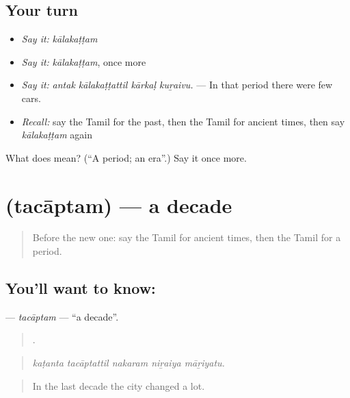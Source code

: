 \subsection*{Your turn}
\begin{itemize}
\raggedright
  \item \emph{Say it:} \emph{kālakaṭṭam}
  \item \emph{Say it:} \emph{kālakaṭṭam}, once more
  \item \emph{Say it:} \emph{antak kālakaṭṭattil kārkaḷ kuṟaivu.} — In that period there were few cars.
  \item \emph{Recall:} say the Tamil for the past, then the Tamil for ancient times, then say \emph{kālakaṭṭam} again
\end{itemize}

\begin{tcolorbox}[breakable,colback=teal!4,colframe=teal!35!black,title={Before you move on}]
What does  mean? (\textquotedblleft{}A period; an era\textquotedblright{}.) Say it once more.
\end{tcolorbox}
\section[\texorpdfstring{\ta{தசாப்தம்} (tacāptam)}{தசாப்தம் (tacāptam)}]{ (tacāptam) — a decade}

\label{lesson:TA-C326-tacaptam}



\begin{quote}
Before the new one: say the Tamil for ancient times, then the Tamil for a period.
\end{quote}

\subsection*{You'll want to know: }
\textbf{} — \emph{tacāptam} — \textquotedblleft{}a decade\textquotedblright{}.

\begin{quote}
    .
\end{quote}

\begin{quote}
\emph{kaṭanta tacāptattil nakaram niṟaiya māṟiyatu.}
\end{quote}

\begin{quote}
In the last decade the city changed a lot.
\end{quote}


